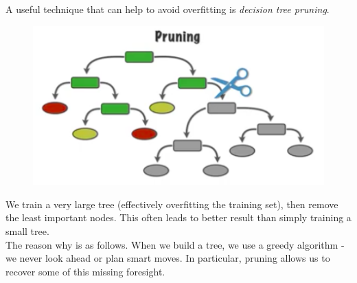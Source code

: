 A useful technique that can help to avoid overfitting is \textit{decision tree pruning}. 
\begin{figure}[H]
\centering
\includegraphics[scale=0.4]{pruning.png}
\end{figure}
We train a very large tree (effectively overfitting the training set), then remove the least important nodes. This often leads to better result than simply training a small tree.\\

The reason why is as follows. When we build a tree, we use a greedy algorithm - we never look ahead or plan smart moves. In particular, pruning allows us to recover some of this missing foresight.







